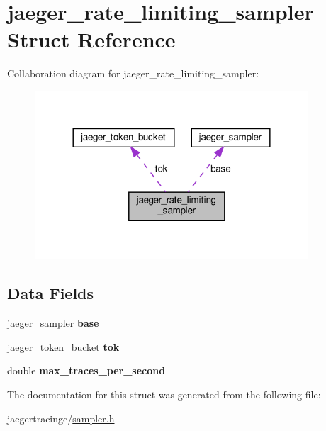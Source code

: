 \hypertarget{structjaeger__rate__limiting__sampler}{}\section{jaeger\+\_\+rate\+\_\+limiting\+\_\+sampler Struct Reference}
\label{structjaeger__rate__limiting__sampler}


Collaboration diagram for jaeger\+\_\+rate\+\_\+limiting\+\_\+sampler\+:\nopagebreak
\begin{figure}[H]
\begin{center}
\leavevmode
\includegraphics[width=288pt]{structjaeger__rate__limiting__sampler__coll__graph}
\end{center}
\end{figure}
\subsection*{Data Fields}
\begin{DoxyCompactItemize}
\item 
\mbox{\label{structjaeger__rate__limiting__sampler_af8345a1a569ea3fee33a7bffa58c453a}} 
\mbox{\hyperlink{structjaeger__sampler}{jaeger\+\_\+sampler}} {\bfseries base}
\item 
\mbox{\label{structjaeger__rate__limiting__sampler_aef9553063816b15b71ac6f5efa967fee}} 
\mbox{\hyperlink{structjaeger__token__bucket}{jaeger\+\_\+token\+\_\+bucket}} {\bfseries tok}
\item 
\mbox{\label{structjaeger__rate__limiting__sampler_a6cfe75697a5e6a2683c7babf40db2be5}} 
double {\bfseries max\+\_\+traces\+\_\+per\+\_\+second}
\end{DoxyCompactItemize}


The documentation for this struct was generated from the following file\+:\begin{DoxyCompactItemize}
\item 
jaegertracingc/\mbox{\hyperlink{sampler_8h}{sampler.\+h}}\end{DoxyCompactItemize}
